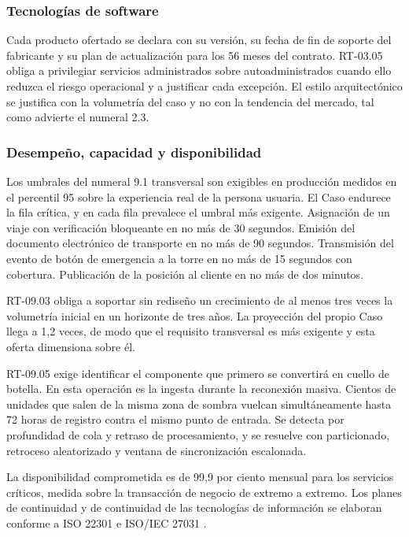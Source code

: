 \subsubsection{Tecnologías de software}

Cada producto ofertado se declara con su versión, su fecha de fin de soporte del fabricante y su
plan de actualización para los 56 meses del contrato. RT-03.05 obliga a privilegiar servicios
administrados sobre autoadministrados cuando ello reduzca el riesgo operacional y a justificar cada
excepción. El estilo arquitectónico se justifica con la volumetría del caso y no con la tendencia
del mercado, tal como advierte el numeral 2.3.

\subsubsection{Desempeño, capacidad y disponibilidad}

Los umbrales del numeral 9.1 transversal son exigibles en producción medidos en el percentil 95
sobre la experiencia real de la persona usuaria. El Caso endurece la fila crítica, y en cada fila
prevalece el umbral más exigente. Asignación de un viaje con verificación bloqueante en no más de
30 segundos. Emisión del documento electrónico de transporte en no más de 90 segundos. Transmisión
del evento de botón de emergencia a la torre en no más de 15 segundos con cobertura. Publicación de
la posición al cliente en no más de dos minutos.

RT-09.03 obliga a soportar sin rediseño un crecimiento de al menos tres veces la volumetría inicial
en un horizonte de tres años. La proyección del propio Caso llega a 1,2 veces, de modo que el
requisito transversal es más exigente y esta oferta dimensiona sobre él.

RT-09.05 exige identificar el componente que primero se convertirá en cuello de botella. En esta
operación es la ingesta durante la reconexión masiva. Cientos de unidades que salen de la misma
zona de sombra vuelcan simultáneamente hasta 72 horas de registro contra el mismo punto de entrada.
Se detecta por profundidad de cola y retraso de procesamiento, y se resuelve con particionado,
retroceso aleatorizado y ventana de sincronización escalonada.

La disponibilidad comprometida es de 99,9 por ciento mensual para los servicios críticos, medida
sobre la transacción de negocio de extremo a extremo. Los planes de continuidad y de continuidad de
las tecnologías de información se elaboran conforme a ISO 22301 \parencite{iso22301} e ISO/IEC
27031 \parencite{iso27031}.

